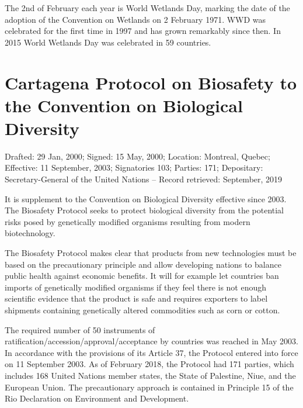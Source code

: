 \documentclass[
]{book}
\begin{document}
The 2nd of February each year is World Wetlands Day, marking the date of the adoption of the Convention on Wetlands on 2 February 1971. WWD was celebrated for the first time in 1997 and has grown remarkably since then. In 2015 World Wetlands Day was celebrated in 59 countries.

\hypertarget{cartagena-protocol-on-biosafety-to-the-convention-on-biological-diversity}{%
\section{Cartagena Protocol on Biosafety to the Convention on Biological Diversity}\label{cartagena-protocol-on-biosafety-to-the-convention-on-biological-diversity}}

Drafted: 29 Jan, 2000; Signed: 15 May, 2000; Location: Montreal, Quebec; Effective: 11 September, 2003; Signatories 103; Parties: 171; Depositary: Secretary-General of the United Nations -- Record retrieved: September, 2019

It is supplement to the Convention on Biological Diversity effective since 2003. The Biosafety Protocol seeks to protect biological diversity from the potential risks posed by genetically modified organisms resulting from modern biotechnology.

The Biosafety Protocol makes clear that products from new technologies must be based on the precautionary principle and allow developing nations to balance public health against economic benefits. It will for example let countries ban imports of genetically modified organisms if they feel there is not enough scientific evidence that the product is safe and requires exporters to label shipments containing genetically altered commodities such as corn or cotton.

The required number of 50 instruments of ratification/accession/approval/acceptance by countries was reached in May 2003. In accordance with the provisions of its Article 37, the Protocol entered into force on 11 September 2003. As of February 2018, the Protocol had 171 parties, which includes 168 United Nations member states, the State of Palestine, Niue, and the European Union.
The precautionary approach is contained in Principle 15 of the Rio Declaration on Environment and Development.
\end{document}
